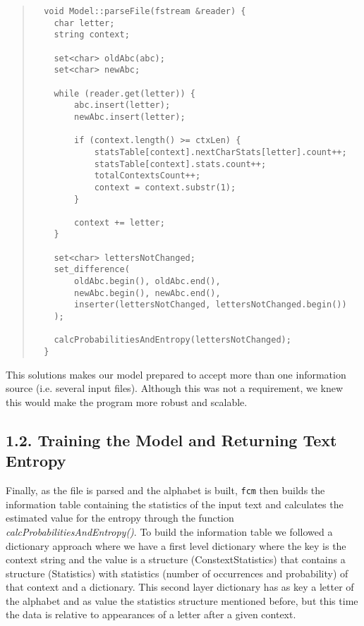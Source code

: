\documentclass[12pt]{article}
\begin{document}
\begingroup
\addtolength\leftmargini{-0.4in}
\addtolength\baselineskip{-0.05in}
\begin{quote}
\begin{verbatim}
  void Model::parseFile(fstream &reader) {
    char letter;
    string context;

    set<char> oldAbc(abc);
    set<char> newAbc;

    while (reader.get(letter)) {
        abc.insert(letter);
        newAbc.insert(letter);

        if (context.length() >= ctxLen) {
            statsTable[context].nextCharStats[letter].count++;
            statsTable[context].stats.count++;
            totalContextsCount++;
            context = context.substr(1);
        }

        context += letter;
    }

    set<char> lettersNotChanged;
    set_difference(
        oldAbc.begin(), oldAbc.end(),
        newAbc.begin(), newAbc.end(),
        inserter(lettersNotChanged, lettersNotChanged.begin())
    );

    calcProbabilitiesAndEntropy(lettersNotChanged);
  }
\end{verbatim}
\end{quote}
\endgroup

This solutions makes our model prepared to accept more than one information
source (i.e. several input files).
Although this was not a requirement, we knew this would make the program more
robust and scalable.

\newpage

\subsection*{1.2. Training the Model and Returning Text Entropy}

Finally, as the file is parsed and the alphabet is built, \texttt{fcm} then 
builds the information table containing the statistics of the input text and
calculates the estimated value for the entropy through the function
{\it calcProbabilitiesAndEntropy()\/}. To build the information table we
followed a dictionary approach where we have a first level dictionary where
the key is the context string and the value is a structure 
(ConstextStatistics) that contains a structure (Statistics) with statistics
(number of occurrences and probability) of that context and a dictionary.
This second layer dictionary has as key a letter of the alphabet and as value
the statistics structure mentioned before, but this time the data is relative
to appearances of a letter after a given context.
\end{document}

